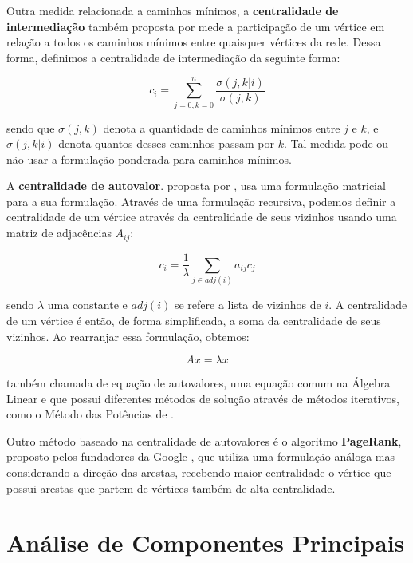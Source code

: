 Outra medida relacionada a caminhos mínimos, a \textbf{centralidade de intermediação} também proposta por  mede a participação de um vértice em relação a todos os caminhos mínimos entre quaisquer vértices da rede. Dessa forma, definimos a centralidade de intermediação da seguinte forma:

\begin{equation}
    c_i = \sum_{j=0,k=0}^{n} \frac{\sigma(j,k|i)}{\sigma(j,k)}
\end{equation}

sendo que $\sigma(j,k)$ denota a quantidade de caminhos mínimos entre $j$ e $k$, e $\sigma(j,k|i)$ denota quantos desses caminhos passam por $k$. Tal medida pode ou não usar a formulação ponderada para caminhos mínimos.

A \textbf{centralidade de autovalor}. proposta por , usa uma formulação matricial para a sua formulação. Através de uma formulação recursiva, podemos definir a centralidade de um vértice através da centralidade de seus vizinhos usando uma matriz de adjacências $A_{ij}$:

\begin{equation}
    c_i = \frac{1}{\lambda} \sum\limits_{j \in adj(i)} a_{ij} c_j
\end{equation}

sendo $\lambda$ uma constante e $adj(i)$ se refere a lista de vizinhos de $i$. A centralidade de um vértice é então, de forma simplificada, a soma da centralidade de seus vizinhos. Ao rearranjar essa formulação, obtemos:

\begin{equation}
    A x = \lambda x
\end{equation}

também chamada de equação de autovalores, uma equação comum na Álgebra Linear e que possui diferentes métodos de solução através de métodos iterativos, como o Método das Potências de .

Outro método baseado na centralidade de autovalores é o algoritmo \textbf{PageRank}, proposto pelos fundadores da Google , que utiliza uma formulação análoga mas considerando a direção das arestas, recebendo maior centralidade o vértice que possui arestas que partem de vértices também de alta centralidade.

\section{Análise de Componentes Principais}
\label{section:metodologia:pca}

